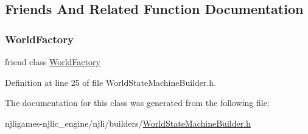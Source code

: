 \subsection{Friends And Related Function Documentation}
\mbox{\label{classnjli_1_1_world_state_machine_builder_acb96ebb09abe8f2a37a915a842babfac}} 
\subsubsection{\texorpdfstring{World\+Factory}{WorldFactory}}
{\footnotesize\ttfamily friend class \mbox{\hyperlink{classnjli_1_1_world_factory}{World\+Factory}}\hspace{0.3cm}{\ttfamily [friend]}}



Definition at line 25 of file World\+State\+Machine\+Builder.\+h.



The documentation for this class was generated from the following file\+:\begin{DoxyCompactItemize}
\item 
njligames-\/njlic\+\_\+engine/njli/builders/\mbox{\hyperlink{_world_state_machine_builder_8h}{World\+State\+Machine\+Builder.\+h}}\end{DoxyCompactItemize}
